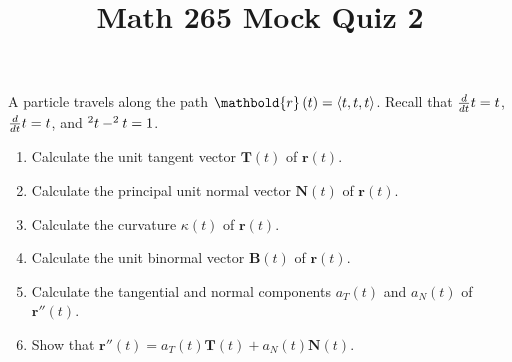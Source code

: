 \documentclass[12pt]{article}
\title{Math 265 Mock Quiz 2}\author{}\date{}
\let\cosh\relax\DeclareMathOperator{\cosh}{\mathsf{cosh}}
\let\sinh\relax\DeclareMathOperator{\sinh}{\mathsf{sinh}}
\begin{document}
\maketitle
\thispagestyle{empty}
A particle travels along the path
$\mathbold{r}\left(t\right)=\left\langle
t,\cosh{t},\sinh{t}\right\rangle$.
Recall that $\frac{d}{dt}\cosh{t}=\sinh{t}$,
$\frac{d}{dt}\sinh{t}=\cosh{t}$,
and $\cosh^2{t}-\sinh^2{t}=1$.
\begin{enumerate}
\item Calculate the unit tangent vector
$\mathbold{T}\left(t\right)$ of $\mathbold{r}\left(t\right)$.
\vspace{2in}
\item Calculate the principal unit normal vector
$\mathbold{N}\left(t\right)$ of $\mathbold{r}\left(t\right)$.
\vspace{2in}
\item Calculate the curvature $\kappa\left(t\right)$
of $\mathbold{r}\left(t\right)$.
\vspace{2in}
\item Calculate the unit binormal vector
$\mathbold{B}\left(t\right)$ of $\mathbold{r}\left(t\right)$.
\vspace{2in}
\item Calculate 
the tangential and normal components 
$a_T\left(t\right)$ and $a_N\left(t\right)$ of $\mathbold{r}''\left(t\right)$.
\vspace{2in}
\item Show that
$\mathbold{r}''\left(t\right)=a_T\left(t\right)\mathbold{T}\left(t\right)
+a_N\left(t\right)\mathbold{N}\left(t\right)$.
\end{enumerate}
\end{document}
